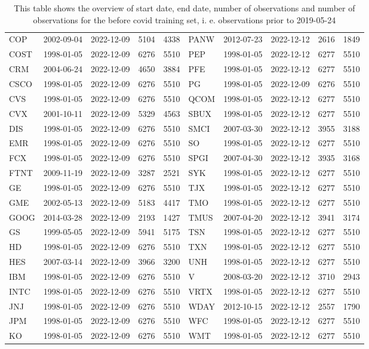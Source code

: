 \begin{table}[ht]
\begin{tabular}{lllrrlllrr}
  COP & 2002-09-04 & 2022-12-09 & 5104 & 4338 & PANW & 2012-07-23 & 2022-12-12 & 2616 & 1849 \\ 
  COST & 1998-01-05 & 2022-12-09 & 6276 & 5510 & PEP & 1998-01-05 & 2022-12-12 & 6277 & 5510 \\ 
  CRM & 2004-06-24 & 2022-12-09 & 4650 & 3884 & PFE & 1998-01-05 & 2022-12-12 & 6277 & 5510 \\ 
  CSCO & 1998-01-05 & 2022-12-09 & 6276 & 5510 & PG & 1998-01-05 & 2022-12-09 & 6276 & 5510 \\ 
  CVS & 1998-01-05 & 2022-12-09 & 6276 & 5510 & QCOM & 1998-01-05 & 2022-12-12 & 6277 & 5510 \\ 
  CVX & 2001-10-11 & 2022-12-09 & 5329 & 4563 & SBUX & 1998-01-05 & 2022-12-12 & 6277 & 5510 \\ 
  DIS & 1998-01-05 & 2022-12-09 & 6276 & 5510 & SMCI & 2007-03-30 & 2022-12-12 & 3955 & 3188 \\ 
  EMR & 1998-01-05 & 2022-12-09 & 6276 & 5510 & SO & 1998-01-05 & 2022-12-12 & 6277 & 5510 \\ 
  FCX & 1998-01-05 & 2022-12-09 & 6276 & 5510 & SPGI & 2007-04-30 & 2022-12-12 & 3935 & 3168 \\ 
  FTNT & 2009-11-19 & 2022-12-09 & 3287 & 2521 & SYK & 1998-01-05 & 2022-12-12 & 6277 & 5510 \\ 
  GE & 1998-01-05 & 2022-12-09 & 6276 & 5510 & TJX & 1998-01-05 & 2022-12-12 & 6277 & 5510 \\ 
  GME & 2002-05-13 & 2022-12-09 & 5183 & 4417 & TMO & 1998-01-05 & 2022-12-12 & 6277 & 5510 \\ 
  GOOG & 2014-03-28 & 2022-12-09 & 2193 & 1427 & TMUS & 2007-04-20 & 2022-12-12 & 3941 & 3174 \\ 
  GS & 1999-05-05 & 2022-12-09 & 5941 & 5175 & TSN & 1998-01-05 & 2022-12-12 & 6277 & 5510 \\ 
  HD & 1998-01-05 & 2022-12-09 & 6276 & 5510 & TXN & 1998-01-05 & 2022-12-12 & 6277 & 5510 \\ 
  HES & 2007-03-14 & 2022-12-09 & 3966 & 3200 & UNH & 1998-01-05 & 2022-12-12 & 6277 & 5510 \\ 
  IBM & 1998-01-05 & 2022-12-09 & 6276 & 5510 & V & 2008-03-20 & 2022-12-12 & 3710 & 2943 \\ 
  INTC & 1998-01-05 & 2022-12-09 & 6276 & 5510 & VRTX & 1998-01-05 & 2022-12-12 & 6277 & 5510 \\ 
  JNJ & 1998-01-05 & 2022-12-09 & 6276 & 5510 & WDAY & 2012-10-15 & 2022-12-12 & 2557 & 1790 \\ 
  JPM & 1998-01-05 & 2022-12-09 & 6276 & 5510 & WFC & 1998-01-05 & 2022-12-12 & 6277 & 5510 \\ 
  KO & 1998-01-05 & 2022-12-09 & 6276 & 5510 & WMT & 1998-01-05 & 2022-12-12 & 6277 & 5510 \\ 
   \hline
\end{tabular}
\caption[Overview]{This table shows the overview of start date, end date, number of observations and number of observations 
                     for the before covid training set, i. e. observations prior to 2019-05-24} 
\label{Table:Overview}
\end{table}
